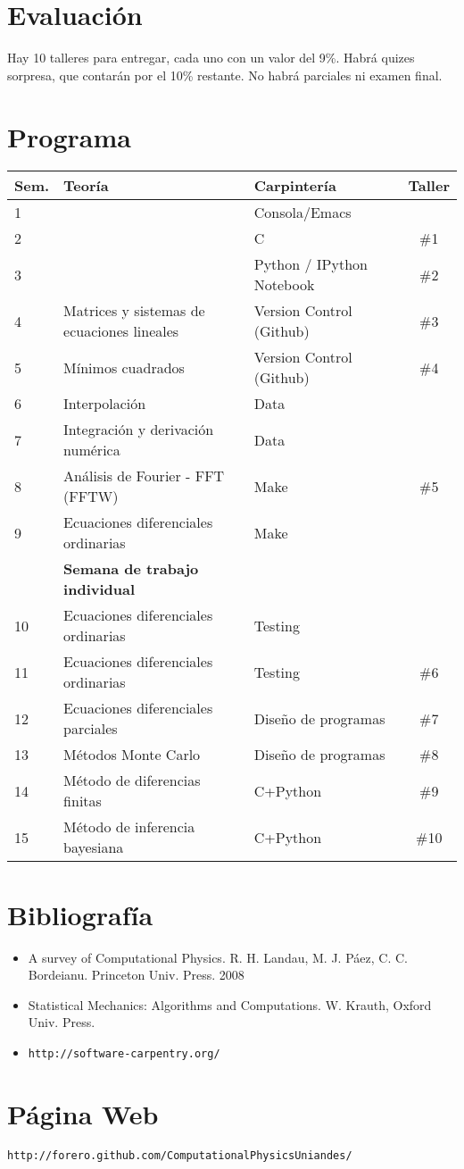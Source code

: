 \documentclass[12pt]{article}
\begin{document}
\section*{Evaluaci\'on}
Hay 10 talleres para entregar, cada uno con un valor del 9\%. Habr\'a  quizes sorpresa, que contar\'an por el 10\% restante. No habr\'a parciales ni examen final.

 
\section*{Programa}

\begin{center}
\begin{tabular}{|l|l|l|c|}
\hline
Sem. & Teor\'ia & Carpinter\'ia & Taller \\\hline
1 & 	&Consola/Emacs &\\
2 & 	&C  & \#1\\
3 & 	&Python / IPython Notebook & \#2\\
4 & Matrices y sistemas de ecuaciones lineales  & Version Control (Github) &\#3\\
5 & M\'inimos cuadrados & Version Control (Github)& \#4\\
6 & Interpolaci\'on & Data & \\
7 & Integraci\'on y derivaci\'on num\'erica & Data &\\
8 & An\'alisis de Fourier - FFT  (FFTW)& Make& \#5 \\
9 & Ecuaciones diferenciales ordinarias & Make&\\
 & {\bf Semana de trabajo individual} & &\\
10 & Ecuaciones diferenciales ordinarias & Testing& \\
11 & Ecuaciones diferenciales ordinarias & Testing & \#6\\
12 & Ecuaciones diferenciales parciales & Dise\~no de programas&\#7\\
13 & M\'etodos Monte Carlo & Dise\~no de programas &\#8\\
14 & M\'etodo de diferencias finitas & C+Python &\#9\\
15 & M\'etodo de inferencia bayesiana& C+Python &\#10\\
\hline
\end{tabular}
\end{center}


\section*{Bibliograf\'ia}
\begin{itemize}
\item
A survey of Computational Physics. R. H. Landau, M. J. P\'aez, C. C.
Bordeianu. Princeton Univ. Press. 2008 
\item
Statistical Mechanics: Algorithms and Computations. W. Krauth, Oxford Univ. Press. 
\item\verb"http://software-carpentry.org/"
\end{itemize}

\section*{P\'agina Web}
\begin{verbatim}
http://forero.github.com/ComputationalPhysicsUniandes/
\end{verbatim}

 
\end{document}

